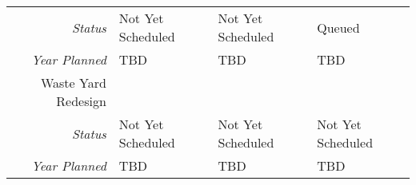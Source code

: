 \begin{tabularx}{\textwidth}{r|X|X|X|}
    \multicolumn{1}{|r|}{\cellcolor{ccorangelight}\textit{Status}}                & Not Yet Scheduled                                                         & Not Yet Scheduled                                                         & Queued                                                         \\
    \multicolumn{1}{|r|}{\cellcolor{ccorangelight}\textit{Year Planned}}                  & TBD                                                     & TBD                                                     & TBD                                                     \\ \hline
\multicolumn{1}{|V{.2\columnwidth}|}{\cellcolor{ccorangelight}Waste Yard Redesign}          &                                                                  &                                                                  &                                                                  \\
    \multicolumn{1}{|r|}{\cellcolor{ccorangelight}\textit{Status}}                & Not Yet Scheduled                                                         & Not Yet Scheduled                                                         & Not Yet Scheduled                                                         \\
    \multicolumn{1}{|r|}{\cellcolor{ccorangelight}\textit{Year Planned}}                  & TBD                                                     & TBD                                                     & TBD                                                     \\ \hline
\end{tabularx}